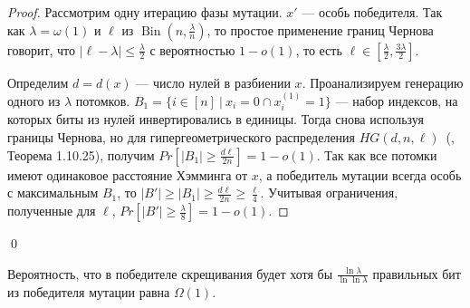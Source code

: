 \documentclass[times]{itmo-student-thesis}
\DeclareMathOperator{\Bin}{Bin}
\begin{document}
\begin{proof}
Рассмотрим одну итерацию фазы мутации. $x'$ --- особь победителя.
Так как $\lambda = \omega(1)$ и $\ell$ из $\Bin\left(n, \frac{\lambda}{n}\right)$, то простое применение границ Чернова~\cite{Doerr2011} говорит, что $|\ell - \lambda| \le \frac{\lambda}{2}$ с вероятностью $1- o(1)$, то есть $\ell \in [\frac{\lambda}{2}, \frac{3\lambda}{2}]$.

Определим $d = d(x)$ --- число нулей в разбиении $x$. Проанализируем генерацию одного из $\lambda$ потомков. $B_1 = \{i \in [n] ~|~ x_i = 0 \cap x^{(1)}_i = 1\}$ --- набор индексов, на которых биты из нулей инвертировались в единицы. Тогда снова используя границы Чернова, но для гипергеометрического распределения $HG(d, n, \ell)$~(\cite{Doerr20bookchapter}, Теорема 1.10.25), получим $Pr[|B_1| \ge \frac{d\ell}{2n}] = 1 - o(1)$.
Так как все потомки имеют одинаковое расстояние Хэмминга от $x$, а победитель мутации всегда особь с максимальным $B_1$, то $|B'| \ge |B_1| \ge \frac{d\ell}{2n} \ge \frac{\ell}{4}$. Учитывая ограничения, полученные для $\ell$, $Pr[|B'| \ge \frac{\lambda}{8}] = 1 - o(1)$.
\end{proof}\qed

\begin{lemma}\label{lem:mut2}
Вероятность, что в победителе скрещивания будет хотя бы $\frac{\ln \lambda}{\ln \ln \lambda}$ правильных бит из победителя мутации равна $\Omega(1)$.
\end{lemma}
\end{document}
